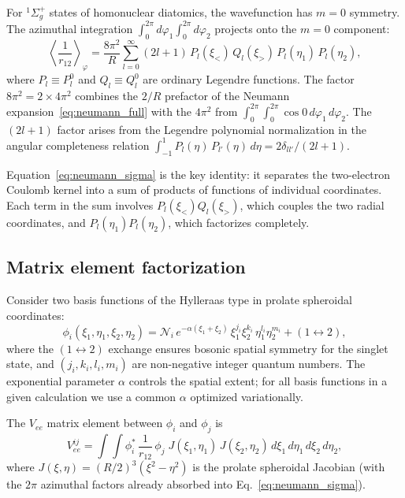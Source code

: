 \documentclass[aps,pra,twocolumn,superscriptaddress,longbibliography]{revtex4-2}
\begin{document}
For $^1\Sigma_g^+$ states of homonuclear diatomics, the
wavefunction has $m = 0$ symmetry.  The azimuthal integration
$\int_0^{2\pi} d\varphi_1 \int_0^{2\pi} d\varphi_2$ projects
onto the $m = 0$ component:
\begin{equation}
  \left\langle\frac{1}{r_{12}}\right\rangle_\varphi
  = \frac{8\pi^2}{R}\sum_{l=0}^{\infty}(2l+1)\,
    P_l(\xi_<)\,Q_l(\xi_>)\,
    P_l(\eta_1)\,P_l(\eta_2),
  \label{eq:neumann_sigma}
\end{equation}
where $P_l \equiv P_l^0$ and $Q_l \equiv Q_l^0$ are ordinary
Legendre functions.  The factor $8\pi^2 = 2 \times 4\pi^2$ combines
the $2/R$ prefactor of the Neumann
expansion~\eqref{eq:neumann_full} with the $4\pi^2$ from
$\int_0^{2\pi}\!\int_0^{2\pi}\!\cos 0\,d\varphi_1\,d\varphi_2$.
The $(2l+1)$ factor arises from the Legendre polynomial
normalization in the angular completeness relation
$\int_{-1}^{1}P_l(\eta)\,P_{l'}(\eta)\,d\eta = 2\delta_{ll'}/(2l+1)$.

Equation~\eqref{eq:neumann_sigma} is the key identity: it
separates the two-electron Coulomb kernel into a sum of products
of functions of individual coordinates.  Each term in the sum
involves $P_l(\xi_<) Q_l(\xi_>)$, which couples the two radial
coordinates, and $P_l(\eta_1) P_l(\eta_2)$, which factorizes
completely.

\subsection{Matrix element factorization}

Consider two basis functions of the Hylleraas type in prolate
spheroidal coordinates:
\begin{equation}
  \phi_i(\xi_1, \eta_1, \xi_2, \eta_2)
  = \mathcal{N}_i\,e^{-\alpha(\xi_1 + \xi_2)}\,
    \xi_1^{j_i}\xi_2^{k_i}\,\eta_1^{l_i}\eta_2^{m_i}
    + (1 \leftrightarrow 2),
  \label{eq:basis_function}
\end{equation}
where the $(1 \leftrightarrow 2)$ exchange ensures bosonic
spatial symmetry for the singlet state, and
$(j_i, k_i, l_i, m_i)$ are non-negative integer quantum
numbers.  The exponential parameter $\alpha$ controls the
spatial extent; for all basis functions in a given calculation
we use a common $\alpha$ optimized variationally.

The $V_{ee}$ matrix element between $\phi_i$ and $\phi_j$ is
\begin{equation}
  V_{ee}^{ij} = \int\!\!\int
    \phi_i^*\,\frac{1}{r_{12}}\,\phi_j\;
    J(\xi_1,\eta_1)\,J(\xi_2,\eta_2)\,
    d\xi_1\,d\eta_1\,d\xi_2\,d\eta_2,
  \label{eq:vee_integral}
\end{equation}
where $J(\xi,\eta) = (R/2)^3(\xi^2 - \eta^2)$ is the prolate
spheroidal Jacobian (with the $2\pi$ azimuthal factors already
absorbed into Eq.~\eqref{eq:neumann_sigma}).
\end{document}
